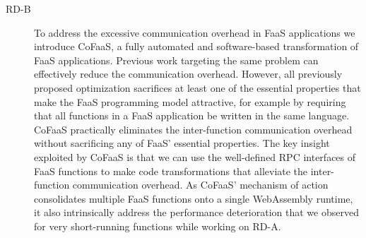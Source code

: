 \documentclass[../main.tex]{subfiles}
\begin{document}
\begin{refsection}
\begin{description}
\item[RD-B] To address the excessive communication overhead in FaaS
  applications we introduce CoFaaS, a fully automated and
  software-based transformation of FaaS applications. Previous work
  targeting the same problem can effectively reduce the communication
  overhead. However, all previously proposed optimization sacrifices
  at least one of the essential properties that make the FaaS
  programming model attractive, for example by requiring that all
  functions in a FaaS application be written in the same
  language. CoFaaS practically eliminates the inter-function
  communication overhead without sacrificing any of FaaS' essential
  properties. The key insight exploited by CoFaaS is that we can use
  the well-defined RPC interfaces of FaaS functions to make code
  transformations that alleviate the inter-function communication
  overhead. As CoFaaS' mechanism of action consolidates multiple FaaS
  functions onto a single WebAssembly runtime, it also intrinsically
  address the performance deterioration that we observed for very
  short-running functions while working on RD-A.

\end{description}




 


\ifx\chapincluded\undefined
  \printbibliography
  \end{refsection}
 \fi
\end{document}
